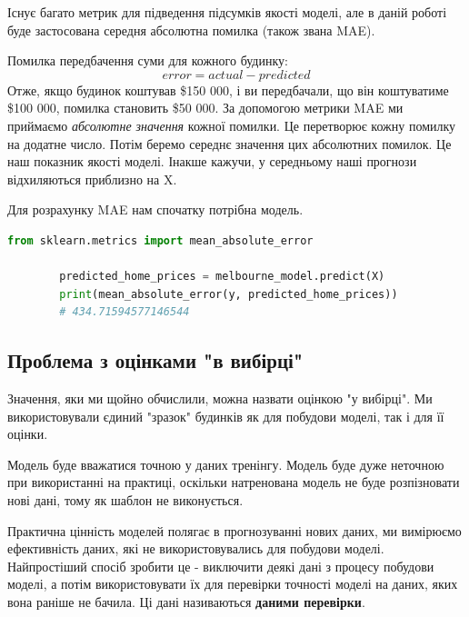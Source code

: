 \documentclass[11pt]{article}
\begin{document}
    Існує багато метрик для підведення підсумків якості моделі, але в даній роботі буде застосована середня абсолютна помилка (також звана MAE).

    Помилка передбачення суми для кожного будинку:
    \[error=actual-predicted\]
    Отже, якщо будинок коштував \$150 000, і ви передбачали, що він коштуватиме \$100 000, помилка становить \$50 000.
    За допомогою метрики MAE ми приймаємо \textit{абсолютне значення} кожної помилки.
    Це перетворює кожну помилку на додатне число.
    Потім беремо середнє значення цих абсолютних помилок.
    Це наш показник якості моделі.
    Інакше кажучи, у середньому наші прогнози відхиляються приблизно на X.

    Для розрахунку MAE нам спочатку потрібна модель.

    \begin{lstlisting}[style=light, language=Python,label={lst:vectorimg},caption=Розрахунок середньої абсолютної похибки]
        from sklearn.metrics import mean_absolute_error

        predicted_home_prices = melbourne_model.predict(X)
        print(mean_absolute_error(y, predicted_home_prices))
        # 434.71594577146544
    \end{lstlisting}

    \subsection{Проблема з оцінками "в вибірці"}\label{subsec:in_sample_problem}
    Значення, яки ми щойно обчислили, можна назвати оцінкою "у вибірці".
    Ми використовували єдиний "зразок" будинків як для побудови моделі, так і для її оцінки.

    Модель буде вважатися точною у даних тренінгу.
    Модель буде дуже неточною при використанні на практиці, оскільки натренована модель не буде розпізновати нові дані, тому як шаблон не виконується.

    Практична цінність моделей полягає в прогнозуванні нових даних, ми вимірюємо ефективність даних, які не використовувались для побудови моделі.
    Найпростіший спосіб зробити це - виключити деякі дані з процесу побудови моделі, а потім використовувати їх для перевірки точності моделі на даних, яких вона раніше не бачила.
    Ці дані називаються \textbf{даними перевірки}.
\end{document}
